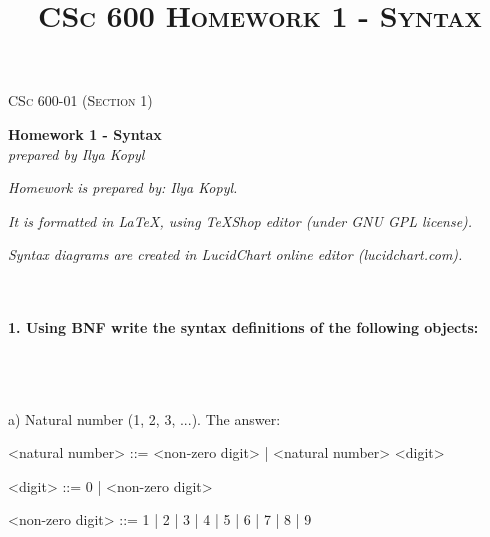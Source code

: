 \documentclass{article}
\begin{document}
	\setlength{\grammarparsep}{5pt plus 1pt minus 1pt} %
	\setlength{\grammarindent}{5cm} 




	\begin{titlepage}
		\begin{center}
				\Large\textsc{CSc 600-01 (Section 1)}
				
				\Large\textbf{Homework 1 - Syntax}\\

				\Large\textit{prepared by Ilya Kopyl}
				
		\end{center}	
	\end{titlepage}


	\title{\textsc{CSc 600 Homework 1 - Syntax}}	
	\maketitle
	
		\textit{Homework is prepared by: Ilya Kopyl.}

		\textit{It is formatted in LaTeX, using TeXShop editor (under GNU GPL license).}
		
		\textit{Syntax diagrams are created in LucidChart online editor (lucidchart.com).}


	\rmfamily\




	\paragraph{1. Using BNF write the syntax definitions of the following objects:}\
	\rmfamily\\\
	
		a) Natural number (1, 2, 3, ...). The answer:
			
	\ttfamily
	\begin{grammar}
	
		<natural number> ::= <non-zero digit> | <natural number> <digit>

		<digit> ::= 0 | <non-zero digit>

		<non-zero digit> ::= 1 | 2 | 3 | 4 | 5 | 6 | 7 | 8 | 9
		
	\end{grammar}
	
	
\end{document}
